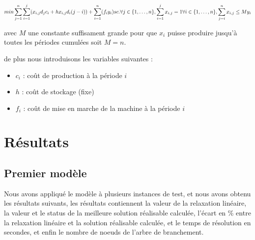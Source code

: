 \documentclass[10pt]{article}
\begin{document}
$$
  min \sum_{j=1}^{n}\sum_{i=1}^{j} (x_{i,j}d_jc_i + hx_{i,j}d_i(j-i)) + \sum_{i=1}^{n}(f_iy_i) \\ 
  sc. \space\space \forall{j}\in\{1,\dots,n\}, \sum_{i=1}^{j}x_{i,j} = 1\\
  \forall{i}\in\{1,\dots, n\} ,\sum_{j=i}^{n}x_{i,j} \le My_i\\
$$

avec $M$ une constante suffisament grande pour que $x_i$ puisse produire jusqu'à toutes les périodes cumulées soit $M = n$.

de plus nous introduisons les variables suivantes :

\begin{itemize}
  \item $c_{i}$ : coût de production à la période $i$
  \item $h$ : coût de stockage (fixe)
  \item $f_{i}$ : coût de mise en marche de la machine à la période $i$
\end{itemize}

\section*{Résultats}

\subsection*{Premier modèle}
Nous avons appliqué le modèle à plusieurs instances de test, et nous avons obtenu les résultats suivants, les résultats contiennent la valeur de la relaxation linéaire, la valeur et le status de la meilleure solution réalisable calculée, l'écart en \% entre la relaxation linéaire et la solution réalisable calculée, et le temps de résolution en secondes, et enfin le nombre de noeuds de l'arbre de branchement.
\end{document}
